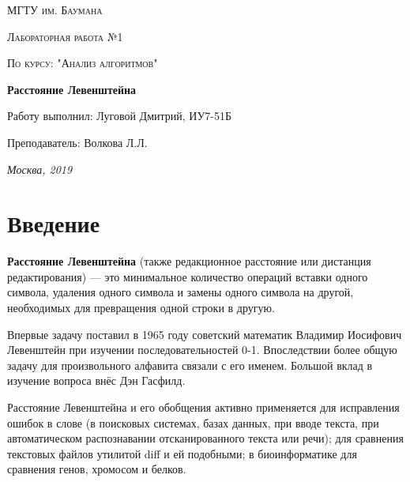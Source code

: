 \documentclass[a4paper,12pt]{report}
\begin{document}
\begin{titlepage}
	\centering
	{\scshape\LARGE МГТУ им. Баумана \par}
	\vspace{4cm}
	{\scshape\Large Лабораторная работа №1\par}
	\vspace{0.5cm}	
	{\scshape\Large По курсу: "Анализ алгоритмов"\par}
	\vspace{2cm}
	{\huge\bfseries Расстояние Левенштейна\par}
	\vspace{3cm}
	\Large Работу выполнил: Луговой Дмитрий, ИУ7-51Б\par
	\vspace{0.5cm}
	\Large Преподаватель:  Волкова Л.Л.\par

	\vfill
	\large \textit {Москва, 2019} \par
\end{titlepage}

\setcounter{page}{2}

\tableofcontents

\newpage
\chapter*{Введение}
\hspace{0.6cm} \textbf{Расстояние Левенштейна} (также редакционное расстояние или дистанция редактирования) — это минимальное количество операций вставки одного символа, удаления одного символа и замены одного символа на другой, необходимых для превращения одной строки в другую.

Впервые задачу поставил в 1965 году советский математик Владимир Иосифович Левенштейн при изучении последовательностей 0-1. Впоследствии более общую задачу для произвольного алфавита связали с его именем. Большой вклад в изучение вопроса внёс Дэн Гасфилд.

Расстояние Левенштейна и его обобщения активно применяется для исправления ошибок в слове (в поисковых системах, базах данных, при вводе текста, при автоматическом распознавании отсканированного текста или речи); для сравнения текстовых файлов утилитой diff и ей подобными; в биоинформатике для сравнения генов, хромосом и белков.
\end{document}
